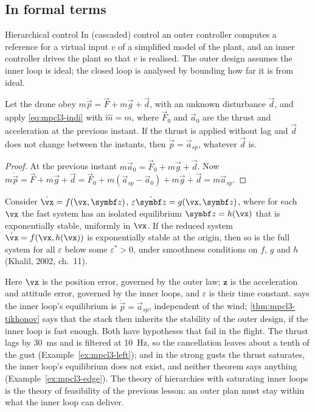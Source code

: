 \subsection{In formal terms}

\begin{definition}{Hierarchical control}
In  (cascaded) control an outer controller computes a reference for a virtual input $v$ of a simplified model of the plant, and an inner controller drives the plant so that $v$ is realised. The outer design assumes the inner loop is ideal; the closed loop is analysed by bounding how far it is from ideal.
\end{definition}

\begin{theorem}
\label{thm:mpcl3-indi}
Let the drone obey $m\ddot{\vec p} = \vec F + m\vec g + \vec d$, with an unknown disturbance $\vec d$, and apply \cref{eq:mpcl3-indi} with $\hat m = m$, where $\vec F_0$ and $\vec a_0$ are the thrust and acceleration at the previous instant. If the thrust is applied without lag and $\vec d$ does not change between the instants, then $\ddot{\vec p} = \vec a_{sp}$, whatever $\vec d$ is.
\end{theorem}
\begin{proof}
At the previous instant $m\vec a_0 = \vec F_0 + m\vec g + \vec d$. Now $m\ddot{\vec p} = \vec F + m\vec g + \vec d = \vec F_0 + m(\vec a_{sp} - \vec a_0) + m\vec g + \vec d = m\vec a_{sp}$.
\end{proof}

\begin{theorem}
\label{thm:mpcl3-tikhonov}
Consider $\dot{\vx} = f(\vx, \symbf z)$, $\varepsilon\dot{\symbf z} = g(\vx, \symbf z)$, where for each $\vx$ the fast system has an isolated equilibrium $\symbf z = h(\vx)$ that is exponentially stable, uniformly in $\vx$. If the reduced system $\dot{\vx} = f(\vx, h(\vx))$ is exponentially stable at the origin, then so is the full system for all $\varepsilon$ below some $\varepsilon^* > 0$, under smoothness conditions on $f$, $g$ and $h$ (Khalil, 2002, ch.~11).
\end{theorem}

Here $\vx$ is the position error, governed by the outer law; $\symbf z$ is the acceleration and attitude error, governed by the inner loops, and $\varepsilon$ is their time constant.  says the inner loop's equilibrium is $\ddot{\vec p} = \vec a_{sp}$, independent of the wind; \cref{thm:mpcl3-tikhonov} says that the stack then inherits the stability of the outer design, if the inner loop is fast enough. Both have hypotheses that fail in the flight. The thrust lags by \SI{30}{ms} and is filtered at \SI{10}{Hz}, so the cancellation leaves about a tenth of the gust (Example~\ref{ex:mpcl3-left}); and in the strong gusts the thrust saturates, the inner loop's equilibrium does not exist, and neither theorem says anything (Example~\ref{ex:mpcl3-edge}). The theory of hierarchies with saturating inner loops is the theory of feasibility of the previous lesson: an outer plan must stay within what the inner loop can deliver.

